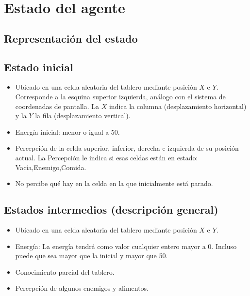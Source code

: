 \section{Estado del agente}

\subsection{Representación del estado}

\subsection{Estado inicial}
\begin{itemize}
\item Ubicado en una celda aleatoria del tablero mediante posición $X$ e $Y$.
Corresponde a la esquina superior izquierda, análogo con el sistema de
coordenadas de pantalla. La $X$ indica la columna (desplazamiento horizontal) y
la $Y$ la fila (desplazamiento vertical).
\item Energía inicial: menor o igual a 50.
\item Percepción de la celda superior, inferior, derecha e izquierda de su
posición actual. La Percepción le indica si esas celdas están en estado:
Vacía,Enemigo,Comida.
\item No percibe qué hay en la celda en la que inicialmente está parado.
\end{itemize}

\subsection{Estados intermedios (descripción general)}
\begin{itemize}
\item Ubicado en una celda aleatoria del tablero mediante posición $X$ e $Y$.
\item Energía: La energía tendrá como valor cualquier entero mayor a 0. Incluso
puede que sea mayor que la inicial y mayor que 50.
\item Conocimiento parcial del tablero.
\item Percepción de algunos enemigos y alimentos.
\end{itemize}

